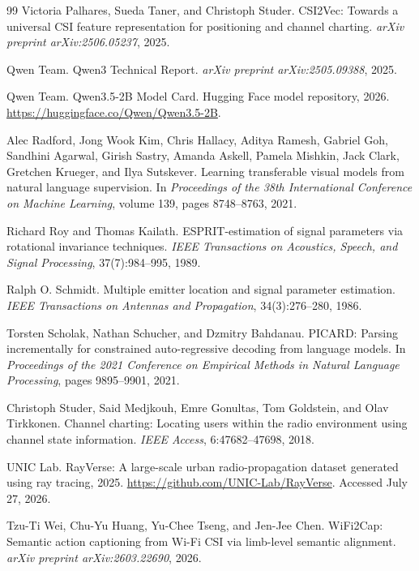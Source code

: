 \begin{thebibliography}{99}
Victoria Palhares, Sueda Taner, and Christoph Studer. CSI2Vec: Towards a universal CSI feature
representation for positioning and channel charting. \emph{arXiv preprint arXiv:2506.05237}, 2025.

Qwen Team. Qwen3 Technical Report. \emph{arXiv preprint arXiv:2505.09388}, 2025.

Qwen Team. Qwen3.5-2B Model Card. Hugging Face model repository, 2026.
\url{https://huggingface.co/Qwen/Qwen3.5-2B}.

Alec Radford, Jong Wook Kim, Chris Hallacy, Aditya Ramesh, Gabriel Goh, Sandhini Agarwal,
Girish Sastry, Amanda Askell, Pamela Mishkin, Jack Clark, Gretchen Krueger, and Ilya Sutskever.
Learning transferable visual models from natural language supervision. In \emph{Proceedings of the
38th International Conference on Machine Learning}, volume 139, pages 8748--8763, 2021.

Richard Roy and Thomas Kailath. ESPRIT-estimation of signal parameters via rotational invariance
techniques. \emph{IEEE Transactions on Acoustics, Speech, and Signal Processing},
37(7):984--995, 1989.

Ralph O. Schmidt. Multiple emitter location and signal parameter estimation. \emph{IEEE
Transactions on Antennas and Propagation}, 34(3):276--280, 1986.

Torsten Scholak, Nathan Schucher, and Dzmitry Bahdanau. PICARD: Parsing incrementally for
constrained auto-regressive decoding from language models. In \emph{Proceedings of the 2021
Conference on Empirical Methods in Natural Language Processing}, pages 9895--9901, 2021.

Christoph Studer, Said Medjkouh, Emre Gonultas, Tom Goldstein, and Olav Tirkkonen. Channel
charting: Locating users within the radio environment using channel state information. \emph{IEEE
Access}, 6:47682--47698, 2018.

UNIC Lab. RayVerse: A large-scale urban radio-propagation dataset generated using ray tracing,
2025. \url{https://github.com/UNIC-Lab/RayVerse}. Accessed July 27, 2026.

Tzu-Ti Wei, Chu-Yu Huang, Yu-Chee Tseng, and Jen-Jee Chen. WiFi2Cap: Semantic action
captioning from Wi-Fi CSI via limb-level semantic alignment. \emph{arXiv preprint
arXiv:2603.22690}, 2026.


\end{thebibliography}
